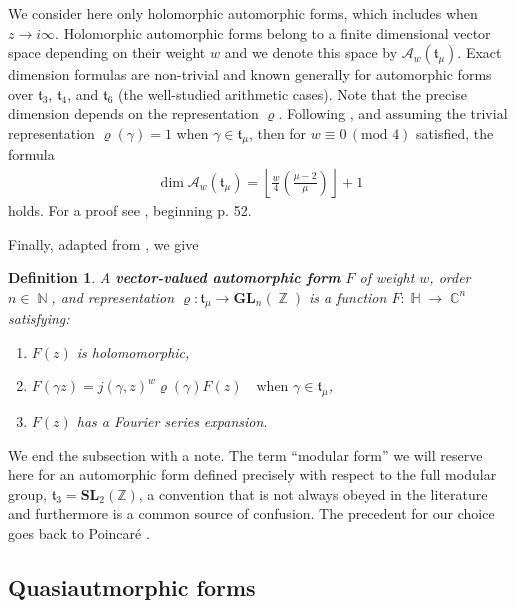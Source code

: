 \documentclass[11pt]{article}
\newtheorem{defin}{Definition}
\DeclareMathOperator{\CC}{\mathbb{C}}
\DeclareMathOperator{\NN}{\mathbb{N}}
\DeclareMathOperator{\ZZ}{\mathbb{Z}}
\DeclareMathOperator{\HH}{\mathbb{H}}
\begin{document}
We consider here only holomorphic automorphic forms, which includes when $ z \rightarrow i \infty $. Holomorphic automorphic forms belong to a finite dimensional vector space depending on their weight $w$ and we denote this space by $ \mathcal{A}_w(\mathfrak{t}_\mu) $. Exact dimension formulas are non-trivial and known generally for automorphic forms over $ \mathfrak{t}_3 $, $\mathfrak{t}_4 $, and $ \mathfrak{t}_6 $ (the well-studied arithmetic cases). Note that the precise dimension depends on the representation $ \varrho $. Following \cite{berndtKnopp2008}, and assuming the trivial representation $ \varrho(\gamma)= 1 $ when $\gamma \in \mathfrak{t}_\mu $, then for $ w \equiv 0 \,(\text{mod } 4) $ satisfied, the formula
    \begin{eqnarray*}
        \dim \mathcal{A}_{w}(\mathfrak{t}_\mu) = \left\lfloor\frac{w}{4}\left( \frac{\mu -2 }{\mu} \right) \right \rfloor + 1
    \end{eqnarray*}
holds. For a proof see \cite{berndtKnopp2008}, beginning p. 52.



Finally, adapted from \cite{francMason2016}, we give 
    \begin{defin}
        A \textbf{vector-valued automorphic form} $ {F} $ of weight $ w $, order $n \in \NN $, and representation $ \varrho: \mathfrak{t}_\mu \rightarrow \mathbf{GL}_n (\ZZ) $ is a function $ F: \HH \rightarrow \CC^n $ satisfying:
            \begin{enumerate}
                \item $F(z)$ is holomomorphic,
                \item $F\left(\gamma z\right) = j(\gamma, z)^w \varrho(\gamma) F(z) \quad \text{when } \gamma \in \mathfrak{t}_\mu $,
                \item $ F(z) $ has a Fourier series expansion.
            \end{enumerate}
    \end{defin}

We end the subsection with a note. The term ``modular form'' we will reserve here for an automorphic form defined precisely with respect to the full modular group, $ \mathfrak{t}_3 = \mathbf{SL}_2(\mathbb{Z}) $, a convention that is not always obeyed in the literature and furthermore is a common source of confusion. The precedent for our choice goes back to Poincar\'{e} \cite{lehner1964}. 

\subsection{Quasiautmorphic forms}
\end{document}
